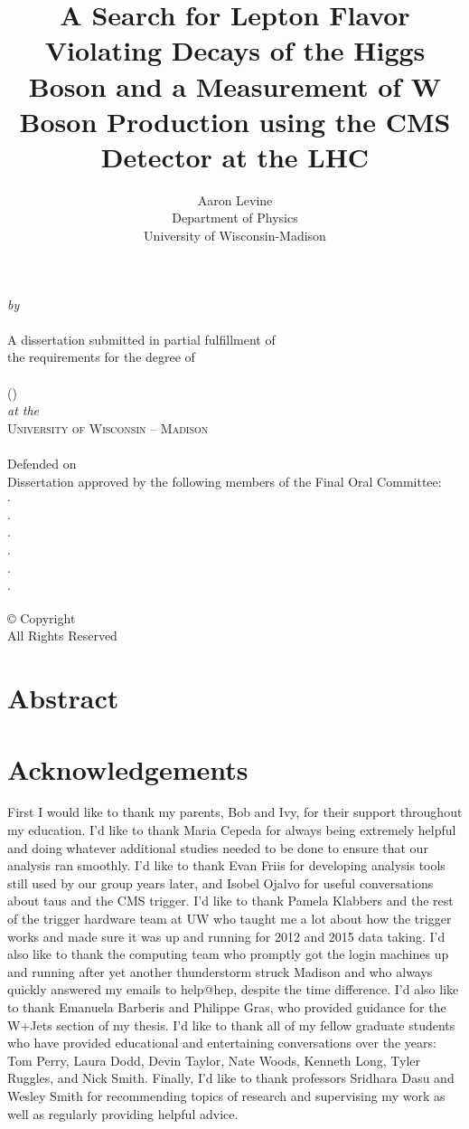 \documentclass[oneside, letterpaper, oldfontcommands]{memoir}
\newcommand{\boxfoc}[3]{\makebox[0.4\textwidth][r]{#1} $\cdot$ \makebox[0.4\textwidth][l]{#2 of #3}}
\newcommand{\thetitlepage}{%
  \thispagestyle{empty}
  \begin{center}
    \vfill
    {\Large\sc\uwtitle\par}
    \vfill
    \emph{by} \\ 
    \uwauthor \\
    \vfill
    A dissertation submitted in partial fulfillment of \\
    the requirements for the degree of \\
    \vfill
    \uwdegree \\
    (\uwdepartment) \\
    \vfill
    \emph{at the} \\
    \textsc{University of Wisconsin -- Madison}\\
    \uwgraddate \\
    \vfill
    \noindent Defended on \uwdefensedate{}\\ Dissertation approved by the following members of the Final Oral Committee: \\
    \ifx\uwfoca\undefined {} 
      \else \boxfoc{\uwfoca}{\uwranka}{\uwdepa} \\
    \fi
    \ifx\uwfocb\undefined {} 
      \else \boxfoc{\uwfocb}{\uwrankb}{\uwdepb} \\
    \fi
    \ifx\uwfocc\undefined {} 
      \else \boxfoc{\uwfocc}{\uwrankc}{\uwdepc} \\
    \fi
    \ifx\uwfocd\undefined {} 
      \else \boxfoc{\uwfocd}{\uwrankd}{\uwdepd} \\
    \fi
    \ifx\uwfoce\undefined {} 
      \else \boxfoc{\uwfoce}{\uwranke}{\uwdepe} \\
    \fi
    \ifx\uwfocf\undefined {} 
      \else \boxfoc{\uwfocf}{\uwrankf}{\uwdepf} \\
    \fi
    \vfill
  \end{center}
  \clearpage
}
\newcommand{\thecopyrightpage}{%
  \thispagestyle{empty}
  \begin{center}
    \null
    \vfill
    \copyright{} Copyright \uwauthor{} \uwgraddate{}\\
    All Rights Reserved
    \vspace{1in}
  \end{center}
}
\newcommand{\theumiabstract}{%
  \clearpage

  \savepagenumber
  \thispagestyle{empty}

  \begin{center}
    {\Large \textsc{\uwtitle}} \\
    \uwauthor \\
    Under the supervision of  \uwranka \uwfoca \\
    At the University of Wisconsin--Madison \\
  \end{center}

  \vspace{\baselineskip}

  \uwabstract

  \clearpage
  \restorepagenumber
}
\begin{document}
\frontmatter


\thetitlepage

\title{A Search for Lepton Flavor Violating Decays of the Higgs Boson and a Measurement of W Boson Production using the CMS Detector at the LHC}
\author{Aaron Levine\\ Department of Physics\\University of Wisconsin-Madison}
\date{}
\thecopyrightpage
\cleardoublepage

\setcounter{page}{1}

\section{Abstract}
\uwabstract
\cleardoublepage



\section{Acknowledgements}
\qquad First I would like to thank my parents, Bob and Ivy, for their support throughout my education. I'd like to thank Maria Cepeda for always being extremely helpful and doing whatever additional studies needed to be done to ensure that our analysis ran smoothly. I'd like to thank Evan Friis for developing analysis tools still used by our group years later, and Isobel Ojalvo for useful conversations about taus and the CMS trigger. I'd like to thank Pamela Klabbers and the rest of the trigger hardware team at UW who taught me a lot about how the trigger works and made sure it was up and running for 2012 and 2015 data taking. I'd also like to thank the computing team who promptly got the login machines up and running after yet another thunderstorm struck Madison and who always quickly answered my emails to help@hep, despite the time difference. I'd also like to thank Emanuela Barberis and Philippe Gras, who provided guidance for the W+Jets section of my thesis. I'd like to thank all of my fellow graduate students who have provided educational and entertaining conversations over the years: Tom Perry, Laura Dodd, Devin Taylor, Nate Woods, Kenneth Long, Tyler Ruggles, and Nick Smith. Finally, I'd like to thank professors Sridhara Dasu and Wesley Smith for recommending topics of research and supervising my work as well as regularly providing helpful advice. 
\end{document}
